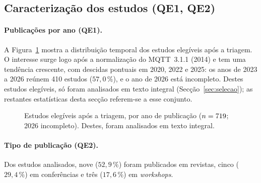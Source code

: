 \subsection{Caracterização dos estudos (QE1, QE2)}
\label{sec:estatistica}

\paragraph{Publicações por ano (QE1).} A Figura~\ref{fig:por-ano} mostra a
distribuição temporal dos \nElegiveis{} estudos elegíveis após a triagem. O
interesse surge logo após a normalização do MQTT~3.1.1 (2014) e tem uma tendência
crescente, com descidas pontuais em 2020, 2022 e 2025: os anos de 2023 a 2026 reúnem 410 estudos ($57{,}0\,\%$), e o ano de 2026
está incompleto. Destes estudos elegíveis, só
\nIncluidos{} foram analisados em texto integral (Secção~\ref{sec:selecao}); as
restantes estatísticas desta secção referem-se a esse conjunto.

\begin{figure}[ht]
  \centering
  \caption{Estudos elegíveis após a triagem, por ano de publicação ($n = 719$; 2026 incompleto). Destes, \nIncluidos{} foram analisados em texto integral.}
  \label{fig:por-ano}
\end{figure}

\paragraph{Tipo de publicação (QE2).} Dos \nIncluidos{} estudos analisados, nove ($52{,}9\,\%$) foram publicados
em revistas, cinco ($29{,}4\,\%$) em conferências e três ($17{,}6\,\%$) em
\emph{workshops}.

